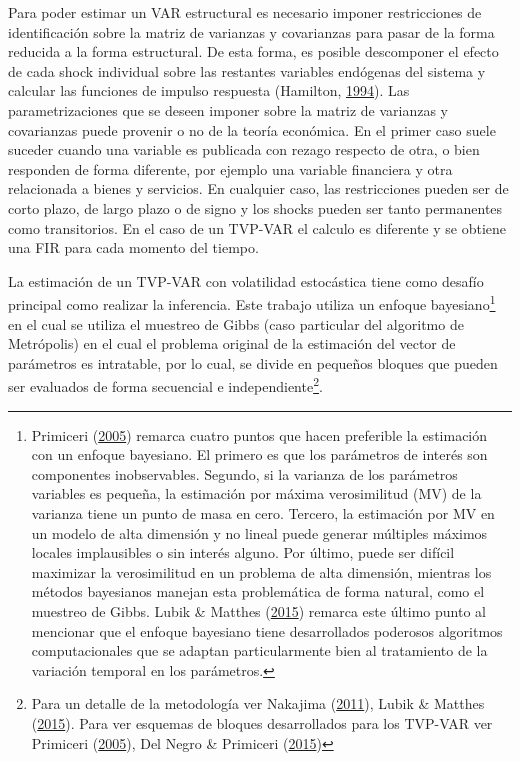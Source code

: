\documentclass[12pt,oneside]{reedthesis}
\begin{document}
Para poder estimar un VAR estructural es necesario imponer restricciones de identificación sobre la matriz de varianzas y covarianzas para pasar de la forma reducida a la forma estructural. De esta forma, es posible descomponer el efecto de cada shock individual sobre las restantes variables endógenas del sistema y calcular las funciones de impulso respuesta (Hamilton, \protect\hyperlink{ref-Hamilton1994}{1994}). Las parametrizaciones que se deseen imponer sobre la matriz de varianzas y covarianzas puede provenir o no de la teoría económica. En el primer caso suele suceder cuando una variable es publicada con rezago respecto de otra, o bien responden de forma diferente, por ejemplo una variable financiera y otra relacionada a bienes y servicios. En cualquier caso, las restricciones pueden ser de corto plazo, de largo plazo o de signo y los shocks pueden ser tanto permanentes como transitorios. En el caso de un TVP-VAR el calculo es diferente y se obtiene una FIR para cada momento del tiempo.

La estimación de un TVP-VAR con volatilidad estocástica tiene como desafío principal como realizar la inferencia. Este trabajo utiliza un enfoque bayesiano\footnote{Primiceri (\protect\hyperlink{ref-Primiceri2005}{2005}) remarca cuatro puntos que hacen preferible la estimación con un enfoque bayesiano. El primero es que los parámetros de interés son componentes inobservables. Segundo, si la varianza de los parámetros variables es pequeña, la estimación por máxima verosimilitud (MV) de la varianza tiene un punto de masa en cero. Tercero, la estimación por MV en un modelo de alta dimensión y no lineal puede generar múltiples máximos locales implausibles o sin interés alguno. Por último, puede ser difícil maximizar la verosimilitud en un problema de alta dimensión, mientras los métodos bayesianos manejan esta problemática de forma natural, como el muestreo de Gibbs. Lubik \& Matthes (\protect\hyperlink{ref-Lubik2016b}{2015}) remarca este último punto al mencionar que el enfoque bayesiano tiene desarrollados poderosos algoritmos computacionales que se adaptan particularmente bien al tratamiento de la variación temporal en los parámetros.} en el cual se utiliza el muestreo de Gibbs (caso particular del algoritmo de Metrópolis) en el cual el problema original de la estimación del vector de parámetros es intratable, por lo cual, se divide en pequeños bloques que pueden ser evaluados de forma secuencial e independiente\footnote{Para un detalle de la metodología ver Nakajima (\protect\hyperlink{ref-Nakajima2011}{2011}), Lubik \& Matthes (\protect\hyperlink{ref-Lubik2016b}{2015}). Para ver esquemas de bloques desarrollados para los TVP-VAR ver Primiceri (\protect\hyperlink{ref-Primiceri2005}{2005}), Del Negro \& Primiceri (\protect\hyperlink{ref-DelNegro2015}{2015})}.
\end{document}

